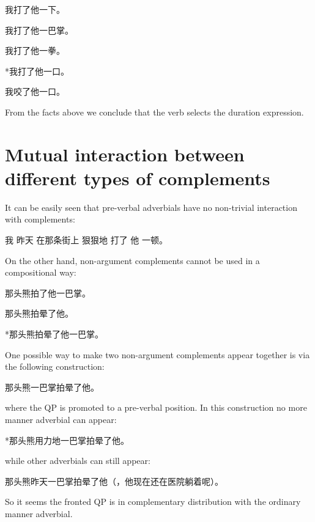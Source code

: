\documentclass[../main.tex]{subfiles}
\begin{document}
我打了他一下。

我打了他一巴掌。

我打了他一拳。

*我打了他一口。

我咬了他一口。

From the facts above we conclude that the verb selects the duration expression. 

\section{Mutual interaction between different types of complements}

It can be easily seen that pre-verbal adverbials have no non-trivial interaction with complements:

我 昨天 在那条街上 狠狠地 打了 他 一顿。

On the other hand, non-argument complements cannot be used in a compositional way:

那头熊拍了他一巴掌。

那头熊拍晕了他。

*那头熊拍晕了他一巴掌。


One possible way to make two non-argument complements appear together is via the following construction:

那头熊一巴掌拍晕了他。

where the QP is promoted to a pre-verbal position. In this construction no more manner adverbial can appear:

*那头熊用力地一巴掌拍晕了他。

while other adverbials can still appear:

那头熊昨天一巴掌拍晕了他（，他现在还在医院躺着呢）。

So it seems the fronted QP is in complementary distribution with the ordinary manner adverbial.
\end{document}

